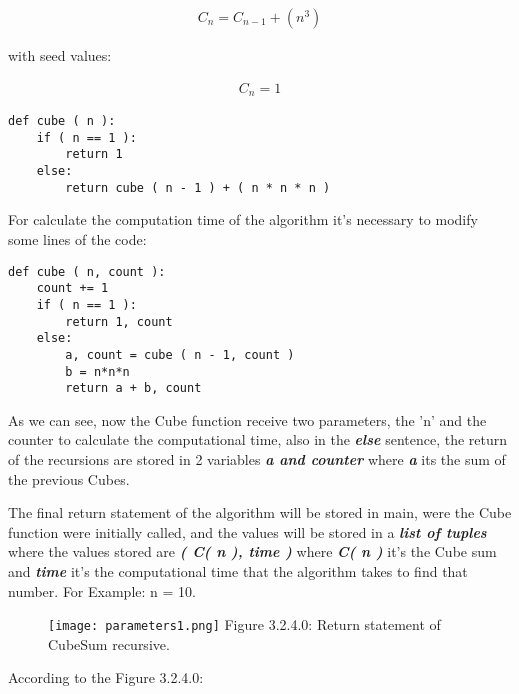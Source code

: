 \documentclass[10pt,a4paper]{article}
\begin{document}
\begin{ceqn}
\begin{align}
C_{n} = C_{n-1} + ( n^{3} )
\end{align}
\end{ceqn}

with seed values:

\begin{ceqn}
\begin{align}
C_{n} = 1
\end{align}
\end{ceqn}

\begin{lstlisting}
def cube ( n ):
    if ( n == 1 ):
        return 1
    else:
        return cube ( n - 1 ) + ( n * n * n )
\end{lstlisting} \hfill

For calculate the computation time of the algorithm it's necessary to modify some lines of the code: \hfill \break

\begin{lstlisting}
def cube ( n, count ):
    count += 1
    if ( n == 1 ):
        return 1, count
    else:
        a, count = cube ( n - 1, count )
        b = n*n*n
        return a + b, count
\end{lstlisting} \hfill

As we can see, now the Cube function receive two parameters, the 'n' and the counter to calculate the computational time, also in the {\bfseries\itshape else} sentence, the return of the recursions are stored in 2 variables {\bfseries\itshape a and counter} where {\bfseries\itshape a} its the sum of the previous Cubes. \hfill \break

The final return statement of the algorithm will be stored in main, were the Cube function were initially called, and the values will be stored in a {\bfseries\itshape list of tuples} where the values stored are {\bfseries\itshape ( C( n ), time )} where {\bfseries\itshape C( n )} it's the Cube sum and {\bfseries\itshape time} it's the computational time that the algorithm takes to find that number. For Example: n = 10.

\begin{figure}[H]
\texttt{[image: parameters1.png]}
\centering \linebreak \linebreak Figure 3.2.4.0: Return statement of CubeSum recursive.
\end{figure}

According to the Figure 3.2.4.0:
\end{document}
